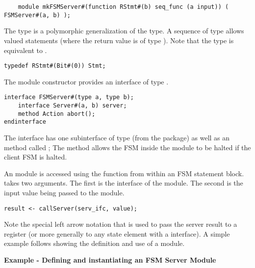 \begin{verbatim}
    module mkFSMServer#(function RStmt#(b) seq_func (a input)) ( FSMServer#(a, b) );
\end{verbatim}

The  type is a polymorphic generalization of the 
type. A sequence of type  allows valued 
statements (where the return value is of type ). Note that
the  type is equivalent to .

\begin{verbatim}
typedef RStmt#(Bit#(0)) Stmt;
\end{verbatim}

The  module constructor provides an
interface of type .

\begin{verbatim}
interface FSMServer#(type a, type b);
    interface Server#(a, b) server;
    method Action abort();
endinterface
\end{verbatim}

The  interface has one subinterface of
type  (from the  package) as well
as an  method called ; The  method
allows the FSM inside the  module to be halted if the
client FSM is halted.  

An  module is accessed using the 
function from within an FSM statement block.  takes two arguments.  The first is the
interface of the  module. The second is the input value
being passed to the module.

\begin{verbatim}
result <- callServer(serv_ifc, value);
\end{verbatim}

Note the special left arrow notation that is used to pass the server
result to a register (or more generally to any state element with
a  interface). A simple example follows showing the definition
and use of a  module.

{\bf Example - Defining and instantiating an FSM Server Module}

